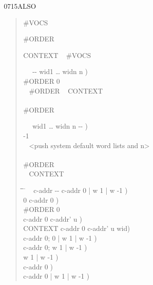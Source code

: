 \begin{worddef}{0715}{ALSO}
\begin{rationale}
		\begin{quote}  \#VOCS

		 \#ORDER

		 CONTEXT ~ \#VOCS  

		\word{:} ~~ -{}- wid1 {\ldots} widn n ) \\
		\tab \#ORDER  0  \\
		\tab~ \#ORDER  ~  \word{-}
			    CONTEXT \word{+}  \\
		\tab {} \\
		\tab \#ORDER  \\
		\word{;}

		\word{:} ~~ wid1 {\ldots} widn n -{}- ) \\
		\tab {} -1 \word{=}  \\
		\tab~  <push system default word lists and n> \\
		\tab {} \\
		\tab {} \#ORDER \word{!} \\
		  ~
			  CONTEXT \word{+} \word{!}
		 \\
		\word{;}

		\begin{tabbing}
		\tab \= \tab \= \tab \= \hspace{10.5em} \= \kill
		\+ \word{:} ~  c-addr -{}- c-addr 0 | w 1 | w -1 ) \\
				0												\>\>\>  c-addr 0 ) \\
			\+	\#ORDER  0  \\
				 						\>\>  c-addr 0 c-addr' u ) \\
				  CONTEXT \word{+} 	\>\>  c-addr 0 c-addr' u wid) \\
									\>\>  c-addr 0; 0 | w 1 | w -1 ) \\
				 							\>\> \word{p} c-addr 0; w 1 | w -1 ) \\
				\>   		\>	  w 1 | w -1 ) \\
			\-											\>\>  c-addr 0 ) \\
		\-												\>\>\>  c-addr 0 | w 1 | w -1 ) \\
		\word{;}
		\end{tabbing}
		\end{quote}


\end{rationale}
\end{worddef}
